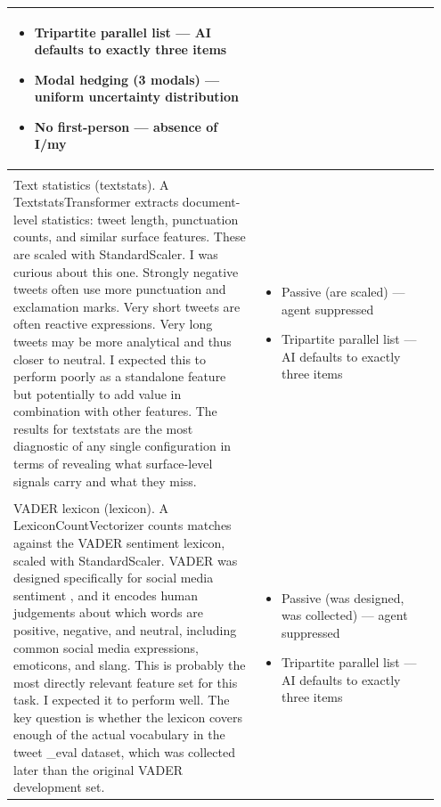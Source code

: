 \documentclass[11pt]{article}
\begin{document}
\begin{longtable}{|p{0.55\linewidth}|p{0.40\linewidth}|}
\begin{itemize}[leftmargin=1em,itemsep=1pt,topsep=1pt,parsep=0pt]
  \item Tripartite parallel list --- AI defaults to exactly three items
  \item Modal hedging (3 modals) --- uniform uncertainty distribution
  \item No first-person --- absence of I/my
\end{itemize} \\[2pt]
\hline
\rule{0pt}{3.5cm} & \\
\hline
Text statistics (textstats). A TextstatsTransformer extracts document-level statistics: tweet length, punctuation counts, and similar surface features. These are scaled with StandardScaler. I was curious about this one. Strongly negative tweets often use more punctuation and exclamation marks. Very short tweets are often reactive expressions. Very long tweets may be more analytical and thus closer to neutral. I expected this to perform poorly as a standalone feature but potentially to add value in combination with other features. The results for textstats are the most diagnostic of any single configuration in terms of revealing what surface-level signals carry and what they miss. & \begin{itemize}[leftmargin=1em,itemsep=1pt,topsep=1pt,parsep=0pt]
  \item Passive (are scaled) --- agent suppressed
  \item Tripartite parallel list --- AI defaults to exactly three items
\end{itemize} \\[2pt]
\hline
\rule{0pt}{3.5cm} & \\
\hline
VADER lexicon (lexicon). A LexiconCountVectorizer counts matches against the VADER sentiment lexicon, scaled with StandardScaler. VADER was designed specifically for social media sentiment , and it encodes human judgements about which words are positive, negative, and neutral, including common social media expressions, emoticons, and slang. This is probably the most directly relevant feature set for this task. I expected it to perform well. The key question is whether the lexicon covers enough of the actual vocabulary in the tweet \_eval dataset, which was collected later than the original VADER development set. & \begin{itemize}[leftmargin=1em,itemsep=1pt,topsep=1pt,parsep=0pt]
  \item Passive (was designed, was collected) --- agent suppressed
  \item Tripartite parallel list --- AI defaults to exactly three items

\end{itemize}
\end{longtable}
\end{document}
